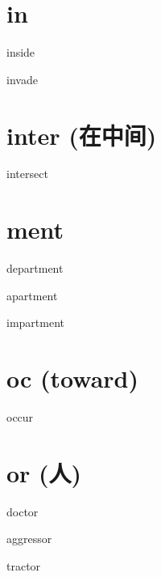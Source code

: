 \section{in}

\begin{wordRef}{inside}
\end{wordRef}

\begin{wordRef}{invade}
\end{wordRef}

\section{inter (在中间)}

\begin{wordRef}{intersect}
\end{wordRef}

\section{ment}

\begin{wordRef}{department}
\end{wordRef}

\begin{wordRef}{apartment}
\end{wordRef}

\begin{wordRef}{impartment}
\end{wordRef}

\section{oc (toward)}

\begin{wordRef}{occur}
\end{wordRef}

\section{or (人)}


\begin{wordRef}{doctor}
\end{wordRef}

\begin{wordRef}{aggressor}
\end{wordRef}

\begin{wordRef}{tractor}
\end{wordRef}


